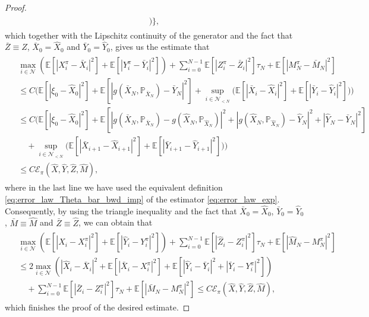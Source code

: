\documentclass[11pt]{article}
\numberwithin{equation}{section}
\theoremstyle{definition}
\theoremstyle{remark}
\def\cE{\mathcal{E}}
\def\cN{\mathcal{N}}
\def\sE{{\mathbb{E}}}
\def\sP{\mathbb{P}}
\begin{document}
\begin{proof}
\begin{align*}
\begin{split}
\bigg)
\bigg\},
\end{split}
\end{align*}
which together with the Lipschitz continuity of the generator and the fact that $\bar{Z}\equiv \hat{Z}$, $\bar{X}_0=\hat{X}_0$ and  $\bar{Y}_0=\hat{Y}_0$,
 gives us the estimate that
\begin{align*}
\begin{split}
&\max_{i\in \cN}
\left(
\sE[|{X}^\pi_{i}
-\bar{X}_{i}|^2]
+
\sE[|{Y}^\pi_{i}
-\bar{Y}_{i}|^2]
\right)
+
\sum_{i=0}^{N-1}
\sE
[
|{Z}^\pi_{i}
-\bar{Z}_{i}|^2]\tau_N
+
\sE[|{M}^\pi_{N}
-\bar{M}_{N}|^2]
\\
&\le
C\bigg(
\sE[| \xi_{0}-\hat{X}_0|^2]
+
\sE[ |g(\bar{X}_N,\sP_{\bar{X}_N})
-\bar{Y}_N|^2]
+\sup_{i\in \cN_{<N}}
\big(
\sE[|\bar{X}_i-\hat{X}_i|^2]
+\sE[|\bar{Y}_i-\hat{Y}_i|^2]
\big)
\bigg)
\\
&\le
C\bigg(
\sE[| \xi_{0}-\hat{X}_0|^2]
+
\sE[ |g(\bar{X}_N,\sP_{\bar{X}_N})-g(\hat{X}_N,\sP_{\hat{X}_N})|^2
+|g(\hat{X}_N,\sP_{\hat{X}_N})-\hat{Y}_N|^2+|\hat{Y}_N-\bar{Y}_N|^2]
\\
&\quad 
+\sup_{i\in \cN_{<N}}
\big(
\sE[|\bar{X}_{i+1}-\hat{X}_{i+1}|^2]
+\sE[|\bar{Y}_{i+1}-\hat{Y}_{i+1}|^2]
\big)
\bigg)
\\
&\le
C\cE_\pi(\hat{X},\hat{Y},\hat{Z}, \hat{M}),
\end{split}
\end{align*}
where in the last line we have used 
the equivalent definition \eqref{eq:error_law_Theta_bar_bwd_imp} of 
the  estimator \eqref{eq:error_law_exp}.
Consequently, by using the triangle inequality 
and the fact that 
$\bar{X}_0=\hat{X}_0$,  $\bar{Y}_0=\hat{Y}_0$,
$\bar{M}\equiv \hat{M}$
and  $\bar{Z}\equiv \hat{Z}$,
we can obtain 
 that
\begin{align*}
\begin{split}
&\max_{i\in \cN}
\left(
\sE[|\hat{X}_{i}
-{X}^\pi_{i}|^2]
+
\sE[|\hat{Y}_{i}
-{Y}^\pi_{i}|^2]
\right)
+
\sum_{i=0}^{N-1}
\sE
[
|\hat{Z}_{i}
-{Z}^\pi_{i}|^2]\tau_N
+
\sE[|\hat{M}_{N}
-{M}^\pi_{N}|^2]
\\
&\le
2\max_{i\in \cN}
\left(
|\hat{X}_{i}
-\bar{X}_{i}|^2
+\sE[|\bar{X}_{i}
-{X}^\pi_{i}|^2]
+
\sE[
|\hat{Y}_{i}
-\bar{Y}_{i}|^2
+|\bar{Y}_{i}
-{Y}^\pi_{i}|^2]
\right)
\\
&\quad
+
\sum_{i=0}^{N-1}
\sE
[
|\bar{Z}_{i}
-{Z}^\pi_{i}|^2]\tau_N
+
\sE[|\bar{M}_{N}
-{M}^\pi_{N}|^2]
\le C\cE_\pi(\hat{X},\hat{Y},\hat{Z}, \hat{M}),
\end{split}
\end{align*}
which finishes the proof of the desired estimate.
%
%
\end{proof}
\end{document}

